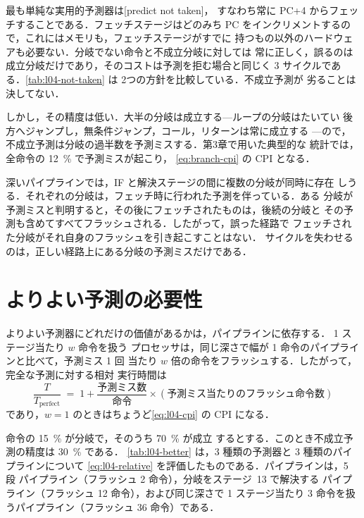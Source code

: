 \documentclass[../main.tex]{subfiles}
\begin{document}
最も単純な実用的予測器は[predict not taken]，
すなわち常に PC+4 からフェッチすることである．フェッチステージはどのみち
PC をインクリメントするので，これにはメモリも，フェッチステージがすでに
持つもの以外のハードウェアも必要ない．分岐でない命令と不成立分岐に対しては
常に正しく，誤るのは成立分岐だけであり，そのコストは予測を拒む場合と同じく
3 サイクルである．\cref{tab:l04-not-taken} は 2つの方針を比較している．不成立予測が
劣ることは決してない．

しかし，その精度は低い．大半の分岐は成立する---ループの分岐はたいてい
後方へジャンプし，無条件ジャンプ，コール，リターンは常に成立する
---ので，不成立予測は分岐の過半数を予測ミスする．第3章で用いた典型的な
統計では，全命令の \SI{12}{\percent} で予測ミスが起こり，
\cref{eq:branch-cpi} の CPI となる．

\begin{note}[処理中の複数の予測]
  深いパイプラインでは，IF と解決ステージの間に複数の分岐が同時に存在
  しうる．それぞれの分岐は，フェッチ時に行われた予測を伴っている．ある
  分岐が予測ミスと判明すると，その後にフェッチされたものは，後続の分岐と
  その予測も含めてすべてフラッシュされる．したがって，誤った経路で
  フェッチされた分岐がそれ自身のフラッシュを引き起こすことはない．
  サイクルを失わせるのは，正しい経路上にある分岐の予測ミスだけである．
\end{note}

\section{よりよい予測の必要性}
\label{sec:l04-better}

よりよい予測器にどれだけの価値があるかは，パイプラインに依存する．
1 ステージ当たり $w$ 命令を扱う
プロセッサは，同じ深さで幅が 1 命令のパイプラインと比べて，予測ミス 1 回
当たり $w$ 倍の命令をフラッシュする．したがって，完全な予測に対する相対
実行時間は
\begin{equation}
  \frac{T}{T_{\text{perfect}}} \;=\; 1 +
  \frac{\text{予測ミス数}}{\text{命令}} \times
  (\text{予測ミス当たりのフラッシュ命令数})
  \label{eq:l04-relative}
\end{equation}
であり，$w=1$ のときはちょうど\cref{eq:l04-cpi} の CPI になる．

\begin{example}
  \label{ex:l04-better}
  命令の \SI{15}{\percent} が分岐で，そのうち \SI{70}{\percent} が成立
  するとする．このとき不成立予測の精度は \SI{30}{\percent} である．
  \cref{tab:l04-better} は，3 種類の予測器と 3 種類のパイプラインについて
  \cref{eq:l04-relative} を評価したものである．パイプラインは，5 段
  パイプライン（フラッシュ 2 命令），分岐をステージ~13 で解決する
  パイプライン（フラッシュ 12 命令），および同じ深さで 1 ステージ当たり
  3 命令を扱うパイプライン（フラッシュ 36 命令）である．
\end{example}
\end{document}
